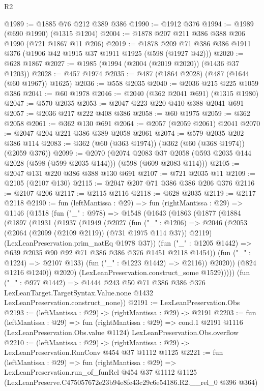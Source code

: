 \begin{lexlean}{R2}
\begin{coremodule}
@1989 := @1885 @76 @212 @389 @386
@1990 := @1912 @376
@1994 := @1989 (@690 @1990) (@1315 @1204)
@2004 := @1878 @207 @211 @386 @388 @206 @1990 (@721 @1867 @11 @206)
@2019 := @1878 @209 @71 @386 @386 @1911 @376 (@1906 @42 @1915 @37 @1911 @1925 (@598 (@1927 @42)))
@2020 := @628 @1867
@2027 := @1985 (@1994 (@2004 (@2019 @2020)) (@1436 @37 @1203))
@2028 := @457 @1974
@2035 := @487 (@1864 @2028) (@487 (@1644 (@60 @1967)) @1625)
@2036 := @558 @2035
@2040 := @2036 @215 @225 @1059 @386
@2041 := @60 @1978
@2046 := @2040 (@362 @2041 @691) (@1315 @1980)
@2047 := @570 @2035
@2053 := @2047 @223 @220 @410 @388 @2041 @691
@2057 := @2036 @217 @222 @408 @386
@2058 := @60 @1975
@2059 := @362 @2058
@2061 := @362 @130 @691
@2064 := @2057 (@2059 @2061) @2041
@2070 := @2047 @204 @221 @386 @389 @2058 @2061
@2074 := @579 @2035 @202 @386 @114
@2083 := @362 (@60 (@363 @1974)) (@362 (@60 (@368 @1974)) (@2059 @376))
@2099 := @2070
    (@2074
      @2083
      @37
      @2058
      (@593 @2035 @144 @2028 (@598 (@599 @2035 @144)))
      (@598 (@609 @2083 @114)))
@2105 := @2047 @131 @220 @386 @388 @130 @691
@2107 := @721 @2035 @11
@2109 := @2105 (@2107 @130)
@2115 := @2047 @207 @71 @386 @386 @206 @376
@2116 := @2107 @206
@2117 := @2115 @2116
@2118 := @628 @2035
@2119 := @2117 @2118
@2190 := fun (leftMantissa : @29) =>
  fun (rightMantissa : @29) =>
  @1146
    (@1518
      (fun ("_" : @978) =>
      @1548
        (@1643
          (@1863
            (@1877
              (@1884
                (@1897
                  (@1931
                    (@1937
                      (@1949
                        (@2027
                          (fun ("_" : @1206) =>
                          @2046
                            (@2053 (@2064 (@2099 (@2109 @2119)) (@731 @1975 @114 @37)) @2119)
                            (LexLeanPreservation.prim_natEq @1978 @37))
                          (fun ("_" : @1205 @1442) =>
                          @639 @2035 @90 @92 @71 @386 @386 @376 @1451 @2118 @1454))
                        (fun ("_" : @1224) => @2107 @133)
                        (fun ("_" : @1223 @1442) => @2116))
                      @2020))
                  (@824 @1216 @1240))
                @2020)
              (LexLeanPreservation.construct_some @1529)))))
      (fun ("_" : @977 @1442) =>
      @1444
        @243
        @50
        @71
        @386
        @386
        @376
        LexLeanTarget.TargetSyntax.Value.none
        @1432
        LexLeanPreservation.construct_none))
@2191 := LexLeanPreservation.Obs
@2193 := (leftMantissa : @29) -> (rightMantissa : @29) -> @2191
@2203 := fun (leftMantissa : @29) =>
  fun (rightMantissa : @29) =>
  cond.{1} @2191 @1116 (LexLeanPreservation.Obs.value @1124) LexLeanPreservation.Obs.overflow
@2210 := (leftMantissa : @29) ->
  (rightMantissa : @29) -> LexLeanPreservation.RunConv @454 @37 @1112 @1125
@2221 := fun (leftMantissa : @29) =>
  fun (rightMantissa : @29) =>
  LexLeanPreservation.run_of_funRel
    @454
    @37
    @1112
    @1125
    (LexLeanPreserve.C475057672e23b94e8fe43c29c6e54186.R2.__rel_0 @396 @364)
\end{coremodule}
\end{lexlean}
